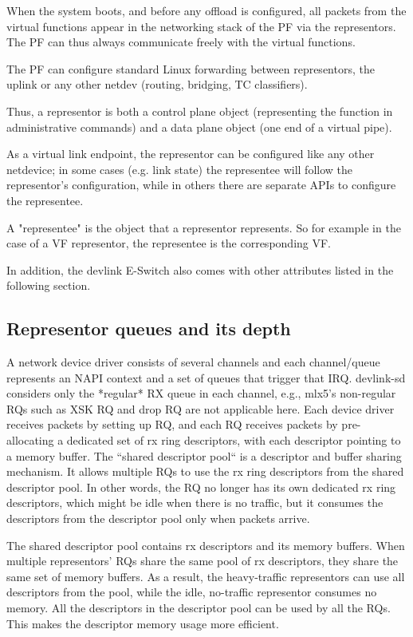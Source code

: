 \documentclass[letterpaper]{article}
\begin{document}
When the system boots, and before any offload is configured, all packets from
the virtual functions appear in the networking stack of the PF via the
representors.  The PF can thus always communicate freely with the virtual functions.

The PF can configure standard Linux forwarding between representors, the uplink
or any other netdev (routing, bridging, TC classifiers).

Thus, a representor is both a control plane object (representing the function in
administrative commands) and a data plane object (one end of a virtual pipe).

As a virtual link endpoint, the representor can be configured like any other
netdevice; in some cases (e.g. link state) the representee will follow the
representor's configuration, while in others there are separate APIs to
configure the representee.
 
A "representee" is the object that a representor represents.  So for example in
the case of a VF representor, the representee is the corresponding VF.

In addition, the devlink E-Switch also comes with other attributes listed
in the following section.

\subsection{Representor queues and its depth}
A network device driver consists of several channels and each channel/queue
represents an NAPI context and a set of queues that trigger that IRQ.
devlink-sd considers only the *regular* RX queue in each channel,
e.g., mlx5's non-regular RQs such as XSK RQ and drop RQ are not applicable
here. Each device driver receives packets by setting up RQ, and
each RQ receives packets by pre-allocating a dedicated set of rx
ring descriptors, with each descriptor pointing to a memory buffer.
The ``shared descriptor pool`` is a descriptor and buffer sharing
mechanism. It allows multiple RQs to use the rx ring descriptors
from the shared descriptor pool. In other words, the RQ no longer has
its own dedicated rx ring descriptors, which might be idle when there
is no traffic, but it consumes the descriptors from the descriptor
pool only when packets arrive.

The shared descriptor pool contains rx descriptors and its memory
buffers. When multiple representors' RQs share the same pool of rx
descriptors, they share the same set of memory buffers. As a result,
the heavy-traffic representors can use all descriptors from the pool,
while the idle, no-traffic representor consumes no memory. All the
descriptors in the descriptor pool can be used by all the RQs. This
makes the descriptor memory usage more efficient.
\end{document}

